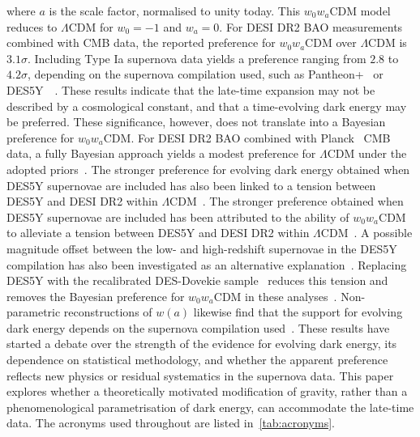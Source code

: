\documentclass[aps,prd,reprint,preprintnumbers,showpacs,floatfix,nofootinbib,superscriptaddress]{revtex4-2}
\newcommand{\LCDM}{\ensuremath{\Lambda\mathrm{CDM}}}
\newcommand{\CLAUD}[1]{\ifmmode\text{#1}\else#1\fi}
\begin{document}
where $a$ is the scale factor, normalised to unity today. This $w_0w_a$CDM model reduces to \LCDM{} for $w_0=-1$ and $w_a=0$. For DESI DR2 BAO measurements combined with CMB data, the reported preference for $w_0w_a$CDM over \LCDM{} is $3.1\sigma$. Including Type Ia supernova data yields a preference ranging from $2.8$ to $4.2\sigma$, depending on the supernova compilation used, such as Pantheon+~\citep{Brout:2022vxf} or DES5Y~\CLAUD{\citep{DES:2024jxu}}~\citep{DESI:2025zgx}. These results indicate that the late-time expansion may not be described by a cosmological constant, and that a time-evolving dark energy may be preferred. These significance, however, does not translate into a Bayesian preference for $w_0w_a$CDM. For DESI DR2 BAO combined with Planck~\cite{Planck:2018vyg} CMB data, a fully Bayesian approach yields a modest preference for \LCDM{} under the adopted priors~\citep{Ong:2025utx,Ong:2026tta}. The stronger preference for evolving dark energy obtained when DES5Y supernovae are included has also been linked to a tension between DES5Y and DESI DR2 within \LCDM{}~\citep{Ong:2025utx,Ong:2026tta}. The stronger preference obtained when DES5Y supernovae are included has been attributed to the ability of $w_0w_a$CDM to alleviate a tension between DES5Y and DESI DR2 within \LCDM{}~\citep{Ong:2025utx,Ong:2026tta}. A possible magnitude offset between the low- and high-redshift supernovae in the DES5Y compilation has also been investigated as an alternative explanation~\citep{Efstathiou:2024xcq,Ormondroyd:2025phk}. Replacing DES5Y with the recalibrated DES-Dovekie sample~\citep{Popovic:2025glk} reduces this tension and removes the Bayesian preference for $w_0w_a$CDM in these analyses~\citep{Ong:2025utx,Ong:2026tta}. Non-parametric reconstructions of $w(a)$ likewise find that the support for evolving dark energy depends on the supernova compilation used~\citep{Ormondroyd:2025iaf}. These results have started a debate over the strength of the evidence for evolving dark energy, its dependence on statistical methodology, and whether the apparent preference reflects new physics or residual systematics in the supernova data. This paper explores whether a theoretically motivated modification of gravity, rather than a phenomenological parametrisation of dark energy, can accommodate the late-time data. The acronyms used throughout are listed in~\cref{tab:acronyms}.
\end{document}
